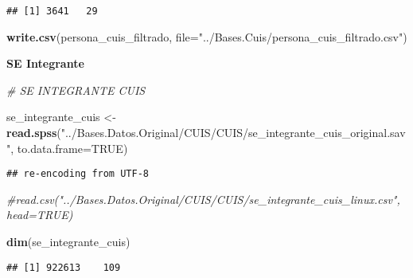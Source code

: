 \documentclass[11pt,]{article}
\newenvironment{Shaded}{\begin{snugshade}}{\end{snugshade}}
\newcommand{\KeywordTok}[1]{\textcolor[rgb]{0.13,0.29,0.53}{\textbf{#1}}}
\newcommand{\DataTypeTok}[1]{\textcolor[rgb]{0.13,0.29,0.53}{#1}}
\newcommand{\DecValTok}[1]{\textcolor[rgb]{0.00,0.00,0.81}{#1}}
\newcommand{\StringTok}[1]{\textcolor[rgb]{0.31,0.60,0.02}{#1}}
\newcommand{\CommentTok}[1]{\textcolor[rgb]{0.56,0.35,0.01}{\textit{#1}}}
\newcommand{\OtherTok}[1]{\textcolor[rgb]{0.56,0.35,0.01}{#1}}
\newcommand{\OperatorTok}[1]{\textcolor[rgb]{0.81,0.36,0.00}{\textbf{#1}}}
\newcommand{\NormalTok}[1]{#1}
\begin{document}
\begin{verbatim}
## [1] 3641   29
\end{verbatim}

\begin{Shaded}
\begin{Highlighting}[]
\KeywordTok{write.csv}\NormalTok{(persona_cuis_filtrado, }\DataTypeTok{file=}\StringTok{"../Bases.Cuis/persona_cuis_filtrado.csv"}\NormalTok{)}
\end{Highlighting}
\end{Shaded}

\textbf{SE Integrante}

\begin{Shaded}
\begin{Highlighting}[]
\CommentTok{# SE INTEGRANTE CUIS}

\NormalTok{se_integrante_cuis <-}\StringTok{ }\KeywordTok{read.spss}\NormalTok{(}\StringTok{"../Bases.Datos.Original/CUIS/CUIS/se_integrante_cuis_original.sav"}\NormalTok{, }\DataTypeTok{to.data.frame=}\OtherTok{TRUE}\NormalTok{)}
\end{Highlighting}
\end{Shaded}

\begin{verbatim}
## re-encoding from UTF-8
\end{verbatim}

\begin{Shaded}
\begin{Highlighting}[]
                      \CommentTok{#read.csv("../Bases.Datos.Original/CUIS/CUIS/se_integrante_cuis_linux.csv", head=TRUE)}

\KeywordTok{dim}\NormalTok{(se_integrante_cuis)}
\end{Highlighting}
\end{Shaded}

\begin{verbatim}
## [1] 922613    109
\end{verbatim}

\begin{Shaded}
\end{Shaded}
\end{document}
